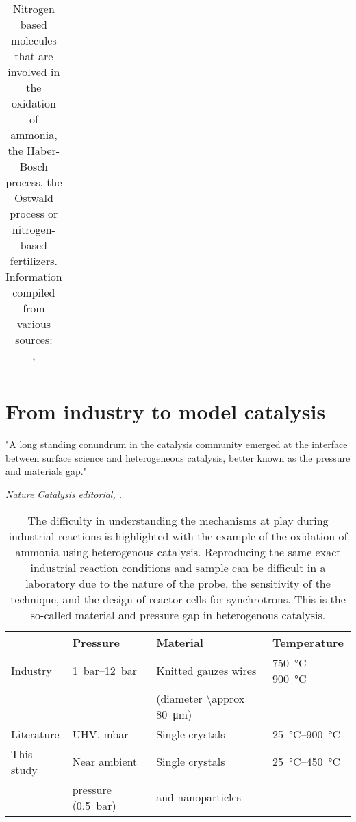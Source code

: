 \begin{landscape}
\begin{table}[!htb]
{\begin{tabular}{@{}l|l|lll|l|l|ll@{}}
    \end{tabular}%
    }
    \caption{
        Nitrogen based molecules that are involved in the oxidation of ammonia, \\
        the Haber-Bosch process, the Ostwald process or nitrogen-based fertilizers.\\
        Information compiled from various sources: \\
        \cite{Thiemann2000, HARRISON2001, Baerns2005, Imbihl2007, Hatscher2008}, \\
        \cite{Davidson2009, Resta2020a,Borodin2021,Pottbacker2022}
    }
    \label{tab:NitrogenGases}
\end{table}
\end{landscape}

\section{From industry to model catalysis}

\epigraph{"A long standing conundrum in the catalysis community emerged at the interface between surface science and heterogeneous catalysis, better known as the pressure and materials gap."}{\textit{Nature Catalysis editorial, \cite*{NatureEditorial2018}.}}

\begin{table}[!htb]
    \centering
    \begin{tabular}{l|l|l|l}
    \toprule
                & Pressure    & Material                         &     Temperature \\
    \midrule
    Industry   & \qtyrange{1}{12}{\bar} & Knitted gauzes wires   & \qtyrange{750}{900}{\degreeCelsius} \\
               &              & (diameter \qty{\approx 80}{\um}) & \\
    \midrule
    Literature & UHV, mbar    & Single crystals                  & \qtyrange{25}{900}{\degreeCelsius} \\
    \midrule
    This study & Near ambient & Single crystals                  & \qtyrange{25}{450}{\degreeCelsius} \\
               & pressure (\qty{0.5}{\bar})  & and nanoparticles & \\
    \bottomrule
    \end{tabular}
    \caption{
        The difficulty in understanding the mechanisms at play during industrial reactions is highlighted with the example of the oxidation of ammonia using heterogenous catalysis.
        Reproducing the same exact industrial reaction conditions \parencite{Hatscher2008} and sample can be difficult in a laboratory due to the nature of the probe, the sensitivity of the technique, and the design of reactor cells for synchrotrons.
        This is the so-called material and pressure gap in heterogenous catalysis.
    }
    \label{tab:Gap}
\end{table}

